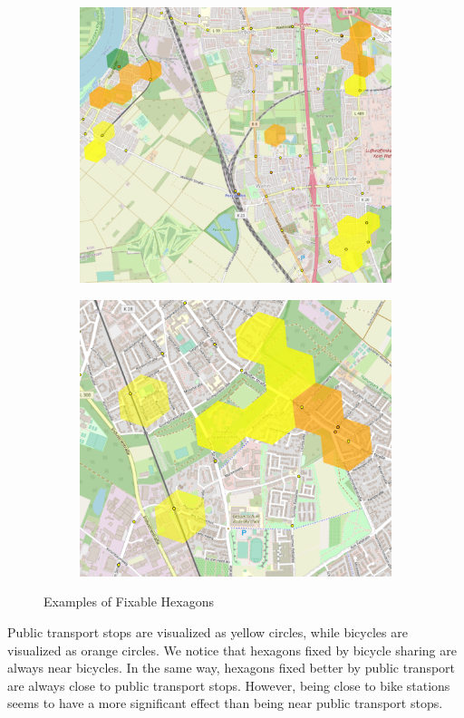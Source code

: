 \begin{figure}
\begin{subfigure}[b]{0.45\textwidth}
         \includegraphics[width=\textwidth]{Figures/results/problematic_hexagons/example_3.png}
     \end{subfigure}
     \hfill
     \begin{subfigure}[b]{0.45\textwidth}
         \centering
         \includegraphics[width=\textwidth]{Figures/results/problematic_hexagons/example_4.png}
     \end{subfigure}
     \caption{Examples of Fixable Hexagons}
        \label{fig:fixable_hexagons_examples}
\end{figure}
Public transport stops are visualized as yellow circles, while bicycles are visualized as orange circles.
We notice that hexagons fixed by bicycle sharing are always near bicycles.
In the same way, hexagons fixed better by public transport are always close to public transport stops. 
However, being close to bike stations seems to have a more significant effect than being near public transport stops.

